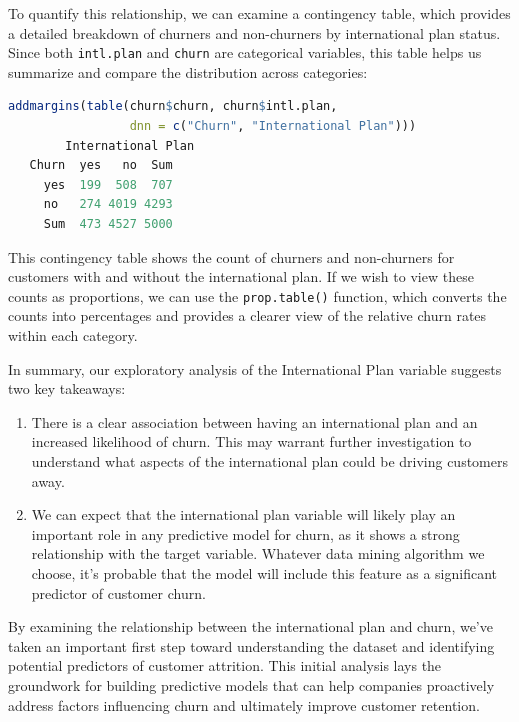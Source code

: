 \documentclass[
]{book}
\newcommand{\passthrough}[1]{#1}
\providecommand{\tightlist}{%
  \setlength{\itemsep}{0pt}\setlength{\parskip}{0pt}}
\theoremstyle{definition}
\theoremstyle{definition}
\theoremstyle{definition}
\theoremstyle{definition}
\theoremstyle{remark}
\begin{document}
To quantify this relationship, we can examine a contingency table, which provides a detailed breakdown of churners and non-churners by international plan status. Since both \passthrough{\lstinline!intl.plan!} and \passthrough{\lstinline!churn!} are categorical variables, this table helps us summarize and compare the distribution across categories:

\begin{lstlisting}[language=R]
addmargins(table(churn$churn, churn$intl.plan, 
                 dnn = c("Churn", "International Plan")))
        International Plan
   Churn  yes   no  Sum
     yes  199  508  707
     no   274 4019 4293
     Sum  473 4527 5000
\end{lstlisting}

This contingency table shows the count of churners and non-churners for customers with and without the international plan. If we wish to view these counts as proportions, we can use the \passthrough{\lstinline!prop.table()!} function, which converts the counts into percentages and provides a clearer view of the relative churn rates within each category.

In summary, our exploratory analysis of the International Plan variable suggests two key takeaways:

\begin{enumerate}
\def\labelenumi{\arabic{enumi}.}
\tightlist
\item
  There is a clear association between having an international plan and an increased likelihood of churn. This may warrant further investigation to understand what aspects of the international plan could be driving customers away.
\item
  We can expect that the international plan variable will likely play an important role in any predictive model for churn, as it shows a strong relationship with the target variable. Whatever data mining algorithm we choose, it's probable that the model will include this feature as a significant predictor of customer churn.
\end{enumerate}

By examining the relationship between the international plan and churn, we've taken an important first step toward understanding the dataset and identifying potential predictors of customer attrition. This initial analysis lays the groundwork for building predictive models that can help companies proactively address factors influencing churn and ultimately improve customer retention.
\end{document}
